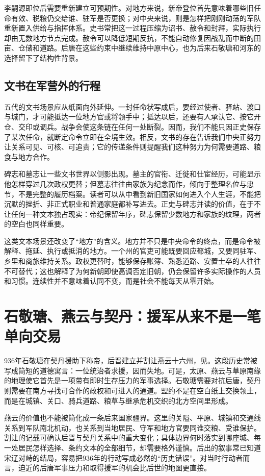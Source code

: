 李嗣源即位后需要重新建立可预期性。对地方来说，新帝登位首先意味着哪些旧任命有效、税粮仍交给谁、驻军是否更换；对中央来说，则是怎样把刚刚动荡的军队重新置入供给与指挥体系。史书常把这一过程压缩为诏书、赦令和封拜，实际执行却由无数地方节点完成。赦令可以降低短期反抗，不能自动修复因战乱而中断的田亩、仓储和道路。后唐在这些约束中继续维持中原中心，也为后来石敬瑭和河东的选择留下了结构性背景。

\subsection{文书在军营外的行程}

五代的文书场景应从纸面向外延伸。一封任命状写成后，要经过使者、驿站、渡口与城门，才可能抵达一位地方官或将领手中；抵达以后，还要有人承认它、按它开仓、交印或调兵。战争会使这条链在任何一处断裂。因而，我们不能只因正史保存了某次任命，就断定命令立即在全境生效。相反，文书的存在告诉我们中央正努力让关系可见、可核、可追责；它的传递条件则提醒我们这种努力为何需要道路、粮食与地方合作。

碑志和墓志让一些文书世界以侧影出现。墓主的官衔、迁徙和仕宦经历，可能显示他怎样穿过几次政权更替；但墓志往往由家族为纪念而作，倾向于整理名位与忠节，不是完整的履历档案。读者可以从中看到新旧国家如何进入个人生涯，不能把沉默的挫折、非正式职业和普通家庭都补写进去。正史与碑志并读的价值，在于不让任何一种文本独占现实：帝纪保留年序，碑志保留少数地方和家族的纹理，两者的空白也同样重要。

这类文本场景还改变了“地方”的含义。地方并不只是中央命令的终点，而是命令被解释、拖延、执行或抵消的地方。一个州的官吏可能既要回应都城，又要同驻军、乡里和商旅维持关系。政权更替时，能够保存账簿、熟悉道路、安置士卒的人往往不可替代；这也解释了为何新朝即使高调否定旧朝，仍会保留许多实际操作的人员和习惯。连续性并不意味着认同不变，而是社会不能每天从零开始。

\section{石敬瑭、燕云与契丹：援军从来不是一笔单向交易}

936年石敬瑭在契丹援助下称帝，后晋建立并割让燕云十六州，见。这段历史常被写成简短的道德寓言：一位统治者求援，因而失地。可是，太原、燕云与草原南缘的地理使它首先是一项带有即时生存压力的军事选择。石敬瑭需要对抗后唐，契丹则需要在南方寻找可合作的政权和可进入的通道。盟约不是在空白纸上交换领土，而是在城镇、关口、骑兵道路、粮草与继承危机交织的北方空间里形成。

燕云的价值也不能被简化成一条后来国家疆界。这里的关隘、平原、城镇和交通线关系到军队南北机动，也关系到当地居民、守军和地方官要同谁交粮、受谁保护。割让的记载可确认后晋与契丹关系中的重大变化；具体边界何时落实到哪座城、每一处居民怎样选择、条约文本的全部细节，却需要格外谨慎。后出的叙事常已知道宋辽对峙的结局，容易把936年的行动写成必然的“历史错误”。对当时行动者而言，迫近的后唐军事压力和取得援军的机会比后世的地图更直接。

